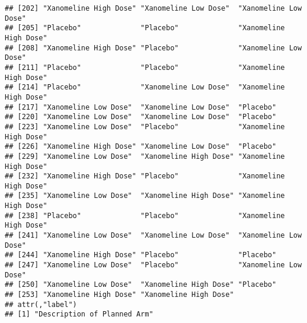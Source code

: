 \documentclass[]{book}
\newenvironment{Shaded}{\begin{snugshade}}{\end{snugshade}}
\newcommand{\CommentTok}[1]{\textcolor[rgb]{0.56,0.35,0.01}{\textit{#1}}}
\newcommand{\NormalTok}[1]{#1}
\newcommand{\OperatorTok}[1]{\textcolor[rgb]{0.81,0.36,0.00}{\textbf{#1}}}
\begin{document}
\begin{verbatim}
## [202] "Xanomeline High Dose" "Xanomeline Low Dose"  "Xanomeline Low Dose" 
## [205] "Placebo"              "Placebo"              "Xanomeline High Dose"
## [208] "Xanomeline High Dose" "Placebo"              "Xanomeline Low Dose" 
## [211] "Placebo"              "Placebo"              "Xanomeline High Dose"
## [214] "Placebo"              "Xanomeline Low Dose"  "Xanomeline High Dose"
## [217] "Xanomeline Low Dose"  "Xanomeline Low Dose"  "Placebo"             
## [220] "Xanomeline Low Dose"  "Xanomeline Low Dose"  "Placebo"             
## [223] "Xanomeline Low Dose"  "Placebo"              "Xanomeline High Dose"
## [226] "Xanomeline High Dose" "Xanomeline Low Dose"  "Placebo"             
## [229] "Xanomeline Low Dose"  "Xanomeline High Dose" "Xanomeline High Dose"
## [232] "Xanomeline High Dose" "Placebo"              "Xanomeline High Dose"
## [235] "Xanomeline Low Dose"  "Xanomeline High Dose" "Xanomeline High Dose"
## [238] "Placebo"              "Placebo"              "Xanomeline High Dose"
## [241] "Xanomeline Low Dose"  "Xanomeline Low Dose"  "Xanomeline Low Dose" 
## [244] "Xanomeline High Dose" "Placebo"              "Placebo"             
## [247] "Xanomeline Low Dose"  "Placebo"              "Xanomeline Low Dose" 
## [250] "Xanomeline Low Dose"  "Xanomeline High Dose" "Placebo"             
## [253] "Xanomeline High Dose" "Xanomeline High Dose"
## attr(,"label")
## [1] "Description of Planned Arm"
\end{verbatim}

\begin{Shaded}
\end{Shaded}
\end{document}
